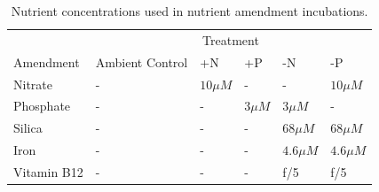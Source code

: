 
\begin{table}[h!]
\centering
\caption[Nutrient concentrations used in nutrient amendment incubations. ]{Nutrient concentrations used in nutrient amendment incubations.}
\label{tab:a3t2}
\begin{tabular}{llllll}
            & \multicolumn{5}{c}{Treatment}                                        \\
Amendment   & Ambient Control & +N         & +P        & -N          & -P          \\\Xhline{2\arrayrulewidth}
Nitrate     & -               & $10 \mu M$ & -         & -           & $10 \mu M$  \\
Phosphate   & -               & -          & $3 \mu M$ & $3 \mu M$   & -           \\
Silica      & -               & -          & -         & $68 \mu M$  & $68 \mu M$  \\
Iron        & -               & -          & -         & $4.6 \mu M$ & $4.6 \mu M$ \\
Vitamin B12 & -               & -          & -         & f/5         & f/5        
\end{tabular}
\end{table}


